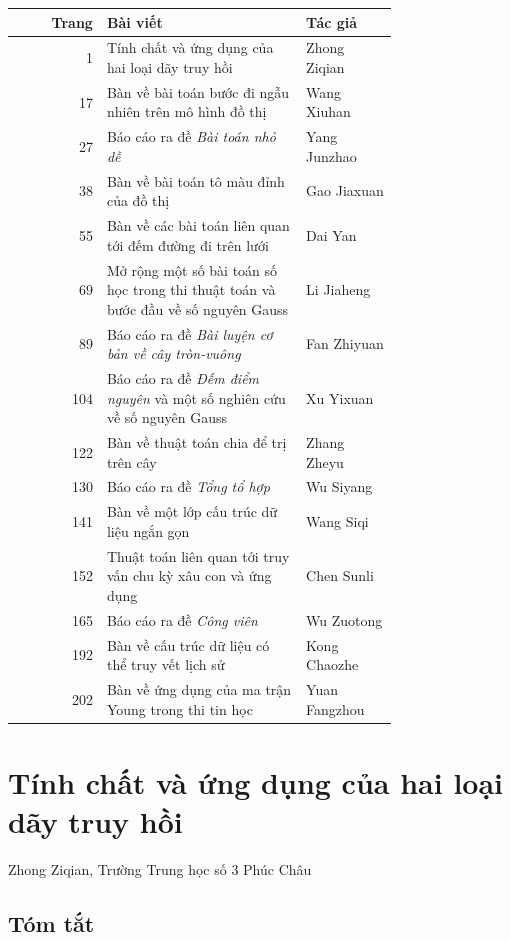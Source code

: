 \documentclass[11pt]{article}
\begin{document}
\begin{center}
\small
\begin{tabular}{r p{0.52\linewidth} p{0.24\linewidth}}
\textbf{Trang} & \textbf{Bài viết} & \textbf{Tác giả} \\
\hline
1 & Tính chất và ứng dụng của hai loại dãy truy hồi & Zhong Ziqian \\
17 & Bàn về bài toán bước đi ngẫu nhiên trên mô hình đồ thị & Wang Xiuhan \\
27 & Báo cáo ra đề \emph{Bài toán nhỏ dễ} & Yang Junzhao \\
38 & Bàn về bài toán tô màu đỉnh của đồ thị & Gao Jiaxuan \\
55 & Bàn về các bài toán liên quan tới đếm đường đi trên lưới & Dai Yan \\
69 & Mở rộng một số bài toán số học trong thi thuật toán và bước đầu về số nguyên Gauss & Li Jiaheng \\
89 & Báo cáo ra đề \emph{Bài luyện cơ bản về cây tròn-vuông} & Fan Zhiyuan \\
104 & Báo cáo ra đề \emph{Đếm điểm nguyên} và một số nghiên cứu về số nguyên Gauss & Xu Yixuan \\
122 & Bàn về thuật toán chia để trị trên cây & Zhang Zheyu \\
130 & Báo cáo ra đề \emph{Tổng tổ hợp} & Wu Siyang \\
141 & Bàn về một lớp cấu trúc dữ liệu ngắn gọn & Wang Siqi \\
152 & Thuật toán liên quan tới truy vấn chu kỳ xâu con và ứng dụng & Chen Sunli \\
165 & Báo cáo ra đề \emph{Công viên} & Wu Zuotong \\
192 & Bàn về cấu trúc dữ liệu có thể truy vết lịch sử & Kong Chaozhe \\
202 & Bàn về ứng dụng của ma trận Young trong thi tin học & Yuan Fangzhou \\
\end{tabular}
\end{center}

\clearpage
\section*{Tính chất và ứng dụng của hai loại dãy truy hồi}

\begin{center}
Zhong Ziqian, Trường Trung học số 3 Phúc Châu
\end{center}

\subsection*{Tóm tắt}
\end{document}
